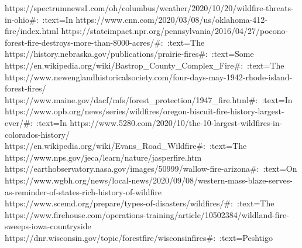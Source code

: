 \documentclass[fontsize=11pt]{article}
\begin{document}
\newline
https://spectrumnews1.com/oh/columbus/weather/2020/10/20/wildfire-threats-in-ohio#:~:text=In%
\newline
https://www.cnn.com/2020/03/08/us/oklahoma-412-fire/index.html
\newline
https://stateimpact.npr.org/pennsylvania/2016/04/27/pocono-forest-fire-destroys-more-than-8000-acres/#:~:text=The%
\newline
https://history.nebraska.gov/publications/prairie-fires#:~:text=Some%
\newline
https://en.wikipedia.org/wiki/Bastrop\_County\_Complex\_Fire#:~:text=The%
\newline
https://www.newenglandhistoricalsociety.com/four-days-may-1942-rhode-island-forest-fires/
\newline
https://www.maine.gov/dacf/mfs/forest\_protection/1947\_fire.html#:~:text=In%
\newline
https://www.opb.org/news/series/wildfires/oregon-biscuit-fire-history-largest-ever/#:~:text=In%
\newline
https://www.5280.com/2020/10/the-10-largest-wildfires-in-colorados-history/
\newline
https://en.wikipedia.org/wiki/Evans\_Road\_Wildfire#:~:text=The%
\newline
https://www.nps.gov/jeca/learn/nature/jasperfire.htm
\newline
https://earthobservatory.nasa.gov/images/50999/wallow-fire-arizona#:~:text=On%
\newline
https://www.wgbh.org/news/local-news/2020/09/08/western-mass-blaze-serves-as-reminder-of-states-rich-history-of-wildfire
\newline
https://www.scemd.org/prepare/types-of-disasters/wildfires/#:~:text=The%
\newline
https://www.firehouse.com/operations-training/article/10502384/wildland-fire-sweeps-iowa-countryside
\newline
https://dnr.wisconsin.gov/topic/forestfire/wisconsinfires#:~:text=Peshtigo%
\end{document}
